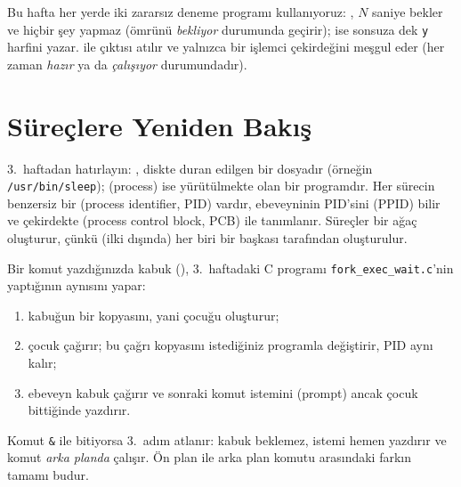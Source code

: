 Bu hafta her yerde iki zararsız deneme programı kullanıyoruz: , $N$ saniye bekler ve hiçbir şey yapmaz (ömrünü \emph{bekliyor} durumunda geçirir);  ise sonsuza dek \texttt{y} harfini yazar.  ile çıktısı atılır ve yalnızca bir işlemci çekirdeğini meşgul eder (her zaman \emph{hazır} ya da \emph{çalışıyor} durumundadır).

\section{Süreçlere Yeniden Bakış}
\label{sec:revisit}

3.~haftadan hatırlayın: , diskte duran edilgen bir dosyadır (örneğin \texttt{/usr/bin/sleep});  (process) ise yürütülmekte olan bir programdır. Her sürecin benzersiz bir  (process identifier, PID) vardır, ebeveyninin PID'sini (PPID) bilir ve çekirdekte  (process control block, PCB) ile tanımlanır. Süreçler bir ağaç oluşturur, çünkü (ilki dışında) her biri bir başkası tarafından oluşturulur.

Bir komut yazdığınızda kabuk (), 3.~haftadaki C programı \texttt{fork\_exec\_wait.c}'nin yaptığının aynısını yapar:
\begin{enumerate}[leftmargin=1.4em]
  \item {} kabuğun bir kopyasını, yani çocuğu oluşturur;
  \item çocuk  çağırır; bu çağrı  kopyasını istediğiniz programla değiştirir, PID aynı kalır;
  \item ebeveyn kabuk  çağırır ve sonraki komut istemini (prompt) ancak çocuk bittiğinde yazdırır.
\end{enumerate}
Komut \texttt{\&} ile bitiyorsa 3.~adım atlanır: kabuk beklemez, istemi hemen yazdırır ve komut \emph{arka planda} çalışır. Ön plan ile arka plan komutu arasındaki farkın tamamı budur.

